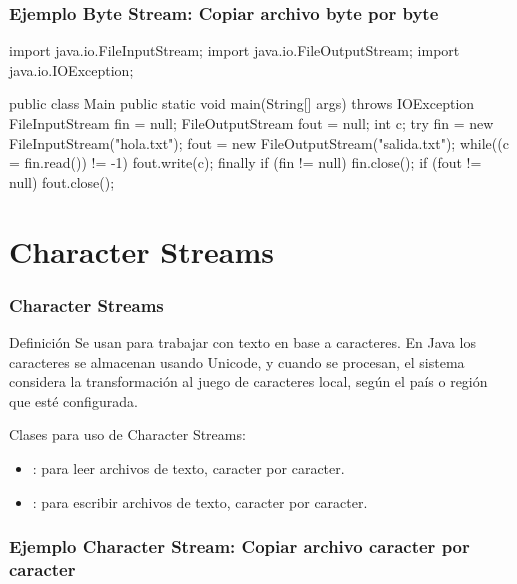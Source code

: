 \documentclass{beamer}
\begin{document}
\begin{frame}[fragile]
  \frametitle{Ejemplo Byte Stream: Copiar archivo byte por byte}

  \begin{jsmall}
    import java.io.FileInputStream;
    import java.io.FileOutputStream;
    import java.io.IOException;

    public class Main {
      public static void main(String[] args) throws IOException {
        FileInputStream  fin  = null;
        FileOutputStream fout = null;
        int c;
        try {
          fin  = new FileInputStream("hola.txt");
          fout = new FileOutputStream("salida.txt");
          while((c = fin.read()) != -1) {
            fout.write(c);
          }
        } finally {
          if (fin != null)  { fin.close(); }
          if (fout != null) { fout.close(); }
        }
      }}
  \end{jsmall}
\end{frame}

\section{Character Streams}

\begin{frame}
  \frametitle{Character Streams}

  \begin{block}{Definición}
    Se usan para trabajar con texto en base a caracteres. En Java los
    caracteres se almacenan usando Unicode, y cuando se procesan, el
    sistema considera la transformación al juego de caracteres local,
    según el país o región que esté configurada.
  \end{block}

  Clases para uso de Character Streams:

  \begin{itemize}

  \item {}: para leer archivos de texto,
    caracter por caracter.

  \item {}: para escribir archivos de texto,
    caracter por caracter.

  \end{itemize}

\end{frame}

 \frametitle{Ejemplo Character Stream: Copiar archivo caracter por caracter}
\end{document}
